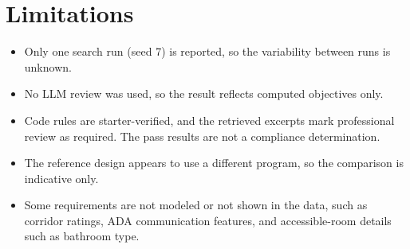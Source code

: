 \documentclass[10pt]{article}
\begin{document}
\section{Limitations}
\begin{itemize}
\item Only one search run (seed 7) is reported, so the variability between runs is unknown.
\item No LLM review was used, so the result reflects computed objectives only.
\item Code rules are starter-verified, and the retrieved excerpts mark professional review as required. The pass results are not a compliance determination.
\item The reference design appears to use a different program, so the comparison is indicative only.
\item Some requirements are not modeled or not shown in the data, such as corridor ratings, ADA communication features, and accessible-room details such as bathroom type.
\end{itemize}
\end{document}
